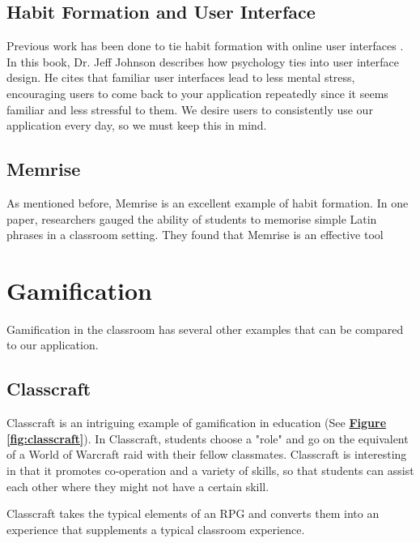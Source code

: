 \subsection{Habit Formation and User Interface}
Previous work has been done to tie habit formation with online user interfaces \cite{johnson2013designing}. In this book, Dr. Jeff Johnson describes how psychology ties into user interface design. He cites that familiar user interfaces lead to less mental stress, encouraging users to come back to your application repeatedly since it seems familiar and less stressful to them. We desire users to consistently use our application every day, so we must keep this in mind. 

\subsection{Memrise}
As mentioned before, Memrise is an excellent example of habit formation. In one paper, researchers gauged the ability of students to memorise simple Latin phrases in a classroom setting. They found that Memrise is an effective tool 

\section{Gamification}
Gamification in the classroom has several other examples that can be compared to our application.

\subsection{Classcraft}
Classcraft is an intriguing example of gamification in education (See \textbf{\hyperref[fig:classcraft]{Figure \ref*{fig:classcraft}}}). In Classcraft, students choose a "role" and go on the equivalent of a World of Warcraft raid with their fellow classmates. Classcraft is interesting in that it promotes co-operation and a variety of skills, so that students can assist each other where they might not have a certain skill. 

Classcraft takes the typical elements of an RPG and converts them into an experience that supplements a typical classroom experience.

